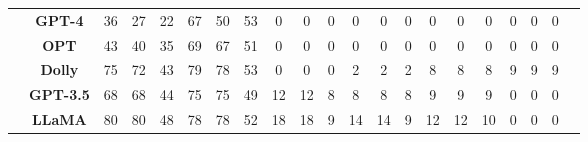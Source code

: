 \begin{table}[H]
{\begin{tabular}{lcccccccccccccccccccc}
&\textbf{GPT-4} &\cellcolor[HTML]{FAEBEB}36 &\cellcolor[HTML]{FAEBEB}27 &\cellcolor[HTML]{FAEBEB}22 &\cellcolor[HTML]{FAEBEB}67 &\cellcolor[HTML]{FAEBEB}50 &\cellcolor[HTML]{FAEBEB}53 &\cellcolor[HTML]{FAEBEB}0 &\cellcolor[HTML]{FAEBEB}0 &\cellcolor[HTML]{FAEBEB}0 &\cellcolor[HTML]{FAEBEB}0 &\cellcolor[HTML]{FAEBEB}0 &\cellcolor[HTML]{FAEBEB}0 &\cellcolor[HTML]{FAEBEB}0 &\cellcolor[HTML]{FAEBEB}0 &\cellcolor[HTML]{FAEBEB}0 &\cellcolor[HTML]{FAEBEB}0 &\cellcolor[HTML]{FAEBEB}0 &\cellcolor[HTML]{FAEBEB}0 \\
&\textbf{OPT} &\cellcolor[HTML]{FAEBEB}43 &\cellcolor[HTML]{FAEBEB}40 &\cellcolor[HTML]{FAEBEB}35 &\cellcolor[HTML]{FAEBEB}69 &\cellcolor[HTML]{FAEBEB}67 &\cellcolor[HTML]{FAEBEB}51 &\cellcolor[HTML]{FAEBEB}0 &\cellcolor[HTML]{FAEBEB}0 &\cellcolor[HTML]{FAEBEB}0 &\cellcolor[HTML]{FAEBEB}0 &\cellcolor[HTML]{FAEBEB}0 &\cellcolor[HTML]{FAEBEB}0 &\cellcolor[HTML]{FAEBEB}0 &\cellcolor[HTML]{FAEBEB}0 &\cellcolor[HTML]{FAEBEB}0 &\cellcolor[HTML]{FAEBEB}0 &\cellcolor[HTML]{FAEBEB}0 &\cellcolor[HTML]{FAEBEB}0 \\
&\textbf{Dolly} &\cellcolor[HTML]{FAEBEB}75 &\cellcolor[HTML]{FAEBEB}72 &\cellcolor[HTML]{FAEBEB}43 &\cellcolor[HTML]{FAEBEB}79 &\cellcolor[HTML]{FAEBEB}78 &\cellcolor[HTML]{FAEBEB}53 &\cellcolor[HTML]{FAEBEB}0 &\cellcolor[HTML]{FAEBEB}0 &\cellcolor[HTML]{FAEBEB}0 &\cellcolor[HTML]{FAEBEB}2 &\cellcolor[HTML]{FAEBEB}2 &\cellcolor[HTML]{FAEBEB}2 &\cellcolor[HTML]{FAEBEB}8 &\cellcolor[HTML]{FAEBEB}8 &\cellcolor[HTML]{FAEBEB}8 &\cellcolor[HTML]{FAEBEB}9 &\cellcolor[HTML]{FAEBEB}9 &\cellcolor[HTML]{FAEBEB}9 \\
&\textbf{GPT-3.5} &\cellcolor[HTML]{FAEBEB}68 &\cellcolor[HTML]{FAEBEB}68 &\cellcolor[HTML]{FAEBEB}44 &\cellcolor[HTML]{FAEBEB}75 &\cellcolor[HTML]{FAEBEB}75 &\cellcolor[HTML]{FAEBEB}49 &\cellcolor[HTML]{FAEBEB}12 &\cellcolor[HTML]{FAEBEB}12 &\cellcolor[HTML]{FAEBEB}8 &\cellcolor[HTML]{FAEBEB}8 &\cellcolor[HTML]{FAEBEB}8 &\cellcolor[HTML]{FAEBEB}8 &\cellcolor[HTML]{FAEBEB}9 &\cellcolor[HTML]{FAEBEB}9 &\cellcolor[HTML]{FAEBEB}9 &\cellcolor[HTML]{FAEBEB}0 &\cellcolor[HTML]{FAEBEB}0 &\cellcolor[HTML]{FAEBEB}0 \\
&\textbf{LLaMA} &\cellcolor[HTML]{FAEBEB}80 &\cellcolor[HTML]{FAEBEB}80 &\cellcolor[HTML]{FAEBEB}48 &\cellcolor[HTML]{FAEBEB}78 &\cellcolor[HTML]{FAEBEB}78 &\cellcolor[HTML]{FAEBEB}52 &\cellcolor[HTML]{FAEBEB}18 &\cellcolor[HTML]{FAEBEB}18 &\cellcolor[HTML]{FAEBEB}9 &\cellcolor[HTML]{FAEBEB}14 &\cellcolor[HTML]{FAEBEB}14 &\cellcolor[HTML]{FAEBEB}9 &\cellcolor[HTML]{FAEBEB}12 &\cellcolor[HTML]{FAEBEB}12 &\cellcolor[HTML]{FAEBEB}10 &\cellcolor[HTML]{FAEBEB}0 &\cellcolor[HTML]{FAEBEB}0 &\cellcolor[HTML]{FAEBEB}0 \\

\end{tabular}}
\end{table}
